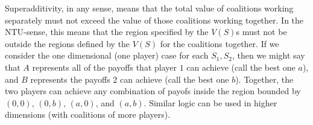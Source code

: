\documentclass{article}
\begin{document}
\begin{enumerate}
Superadditivity, in any sense, means that the total value of coalitions working separately must not exceed the value of those coalitions working together. In the NTU-sense, this means that the region specified by the $V(S)$s must not be outside the regions defined by the $V(S)$ for the coalitions together. If we consider the one dimensional (one player) case for each $S_{1}, S_{2}$, then we might say that $A$ represents all of the payoffs that player $1$ can achieve (call the best one $a$), and $B$ represents the payoffs $2$ can achieve (call the best one $b$). Together, the two players can achieve any combination of payofs inside the region bounded by $(0, 0)$, $(0, b)$, $(a, 0)$, and $(a,b)$. Similar logic can be used in higher dimensions (with coalitions of more players).

%
\end{enumerate}
\end{document}
